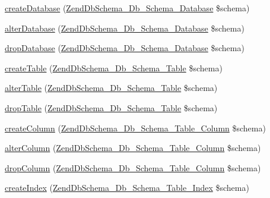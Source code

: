 \begin{DoxyCompactItemize}
\item 
\hyperlink{classZendDbSchema__Db__Schema__Generator__Mysql_a823d987af06bbcaa2142f2da3c6fd3c2}{create\-Database} (\hyperlink{classZendDbSchema__Db__Schema__Database}{\-Zend\-Db\-Schema\-\_\-\-Db\-\_\-\-Schema\-\_\-\-Database} \$schema)
\item 
\hyperlink{classZendDbSchema__Db__Schema__Generator__Mysql_a5ffe10ce956b3e189c364d2bd03acf88}{alter\-Database} (\hyperlink{classZendDbSchema__Db__Schema__Database}{\-Zend\-Db\-Schema\-\_\-\-Db\-\_\-\-Schema\-\_\-\-Database} \$schema)
\item 
\hyperlink{classZendDbSchema__Db__Schema__Generator__Mysql_ab3c87af9fdc6ba8d911b1162a67dc0be}{drop\-Database} (\hyperlink{classZendDbSchema__Db__Schema__Database}{\-Zend\-Db\-Schema\-\_\-\-Db\-\_\-\-Schema\-\_\-\-Database} \$schema)
\item 
\hyperlink{classZendDbSchema__Db__Schema__Generator__Mysql_add2a0dcdb35c6ef230b09ad31d141b29}{create\-Table} (\hyperlink{classZendDbSchema__Db__Schema__Table}{\-Zend\-Db\-Schema\-\_\-\-Db\-\_\-\-Schema\-\_\-\-Table} \$schema)
\item 
\hyperlink{classZendDbSchema__Db__Schema__Generator__Mysql_aebe278ab07f38d58f8f440f9cad01565}{alter\-Table} (\hyperlink{classZendDbSchema__Db__Schema__Table}{\-Zend\-Db\-Schema\-\_\-\-Db\-\_\-\-Schema\-\_\-\-Table} \$schema)
\item 
\hyperlink{classZendDbSchema__Db__Schema__Generator__Mysql_a963a138b593e5e9e3a6b9a8e540a4a10}{drop\-Table} (\hyperlink{classZendDbSchema__Db__Schema__Table}{\-Zend\-Db\-Schema\-\_\-\-Db\-\_\-\-Schema\-\_\-\-Table} \$schema)
\item 
\hyperlink{classZendDbSchema__Db__Schema__Generator__Mysql_a86040ff7c424a0ad7e5f4aadeec20a4c}{create\-Column} (\hyperlink{classZendDbSchema__Db__Schema__Table__Column}{\-Zend\-Db\-Schema\-\_\-\-Db\-\_\-\-Schema\-\_\-\-Table\-\_\-\-Column} \$schema)
\item 
\hyperlink{classZendDbSchema__Db__Schema__Generator__Mysql_a57a5e637e2c19faee40597d96d6b71b3}{alter\-Column} (\hyperlink{classZendDbSchema__Db__Schema__Table__Column}{\-Zend\-Db\-Schema\-\_\-\-Db\-\_\-\-Schema\-\_\-\-Table\-\_\-\-Column} \$schema)
\item 
\hyperlink{classZendDbSchema__Db__Schema__Generator__Mysql_a6fef0a3176c0e99d533b1790c7ae0301}{drop\-Column} (\hyperlink{classZendDbSchema__Db__Schema__Table__Column}{\-Zend\-Db\-Schema\-\_\-\-Db\-\_\-\-Schema\-\_\-\-Table\-\_\-\-Column} \$schema)
\item 
\hyperlink{classZendDbSchema__Db__Schema__Generator__Mysql_a5546e56c0c78f9c9d3e830fb5ffcd72d}{create\-Index} (\hyperlink{classZendDbSchema__Db__Schema__Table__Index}{\-Zend\-Db\-Schema\-\_\-\-Db\-\_\-\-Schema\-\_\-\-Table\-\_\-\-Index} \$schema)

\end{DoxyCompactItemize}
